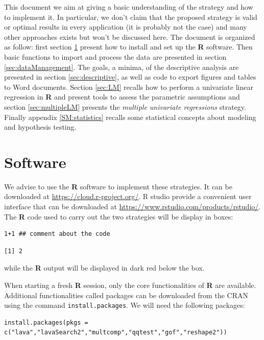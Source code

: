 \documentclass{article}
\newcommand\Rlogo{\textbf{\textsf{R}}}
\begin{document}
\bigskip

This document we aim at giving a basic understanding of the strategy
  and how to implement it. In particular, we don't claim that the
  proposed strategy is valid or optimal results in every application
  (it is probably not the case) and many other approaches exists but
  won't be discussed here. The document is organized as follow: first
  section \ref{sec:Rsoftware} present how to install and set up the
  \Rlogo{} software. Then basic functions to import and process the
  data are presented in section \ref{sec:dataManagement}. The goals, a
  minima, of the descriptive analysis are presented in section
  \ref{sec:descriptive}, as well as code to export figures and tables to
  Word documents. Section \ref{sec:LM} recalls how to perform a univariate
  linear regression in \Rlogo{} and present tools to assess the
  parametric assumptions and section \ref{sec:multipleLM} presents the
  \emph{multiple univariate regressions} strategy. Finally appendix
  \ref{SM:statistics} recalls some statistical concepts about modeling and
  hypothesis testing.

\clearpage

\section{Software}
\label{sec:Rsoftware}
We advise to use the \Rlogo{} software to implement these strategies. It can
be downloaded at \url{https://cloud.r-project.org/}. R studio provide a
convenient user interface that can be downloaded at
\url{https://www.rstudio.com/products/rstudio/}.  The \Rlogo{} code used to carry
out the two strategies will be display in boxes:
\lstset{language=r,label= ,caption= ,captionpos=b,numbers=none}
\begin{lstlisting}
1+1 ## comment about the code
\end{lstlisting}

\begin{verbatim}
[1] 2
\end{verbatim}

while the \Rlogo{} output will be displayed in dark red below the box. 

\bigskip

When starting a fresh \Rlogo{} session, only the core functionalities of
\Rlogo{} are available. Additional functionalities called packages can
be downloaded from the CRAN using the command \texttt{install.packages}. We
will need the following packages:
\lstset{language=r,label= ,caption= ,captionpos=b,numbers=none}
\begin{lstlisting}
install.packages(pkgs = c("lava","lavaSearch2","multcomp","qqtest","gof","reshape2"))
\end{lstlisting}
\end{document}
